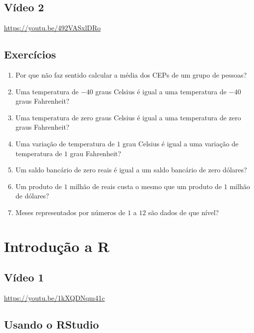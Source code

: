 \documentclass[
  11pt]{report}
\begin{document}
\hypertarget{niveis-de-dados}{%
\section{Vídeo 2}\label{niveis-de-dados}}

\begin{center} \url{https://youtu.be/492VASxlDRo} \end{center}

\hypertarget{exercuxedcios-1}{%
\section{Exercícios}\label{exercuxedcios-1}}

\begin{enumerate}
\def\labelenumi{\arabic{enumi}.}
\item
  Por que não faz sentido calcular a média dos CEPs de um grupo de pessoas?
\item
  Uma temperatura de $-40$ graus Celsius é igual a uma temperatura de $-40$ graus Fahrenheit?
\item
  Uma temperatura de zero graus Celsius é igual a uma temperatura de zero graus Fahrenheit?
\item
  Uma variação de temperatura de $1$ grau Celsius é igual a uma variação de temperatura de $1$ grau Fahrenheit?
\item
  Um saldo bancário de zero reais é igual a um saldo bancário de zero dólares?
\item
  Um produto de $1$ milhão de reais custa o mesmo que um produto de $1$ milhão de dólares?
\item
  Meses representados por números de $1$ a $12$ são dados de que nível?
\end{enumerate}

\hypertarget{rintro}{%
\chapter{Introdução a R}\label{rintro}}

\hypertarget{vuxeddeo-1-1}{%
\section{Vídeo 1}\label{vuxeddeo-1-1}}

\begin{center} \url{https://youtu.be/1kXQDNqm41c} \end{center}

\hypertarget{usando-o-rstudio}{%
\section{Usando o RStudio}\label{usando-o-rstudio}}
\end{document}
